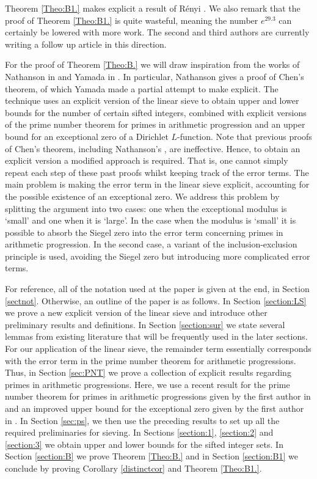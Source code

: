 \documentclass[12pt]{amsart}
\begin{document}
Theorem \ref{Theo:B1.} makes explicit a result of R\'enyi \cite{Renyi}. We also remark that the proof of Theorem \ref{Theo:B1.} is quite wasteful, meaning the number $e^{29.3}$ can certainly be lowered with more work. The second and third authors are currently writing a follow up article in this direction.

For the proof of Theorem \ref{Theo:B.} we will draw inspiration from the works of Nathanson in \cite{Nathanson} and Yamada in \cite{Yamada1}. In particular, Nathanson \cite[Theorem 10.1]{Nathanson} gives a proof of Chen's theorem, of which Yamada \cite[Theorem 1.1]{Yamada1} made a partial attempt to make explicit. The technique uses an explicit version of the linear sieve to obtain upper and lower bounds for the number of certain sifted integers, combined with explicit versions of the prime number theorem for primes in arithmetic progression and an upper bound for an exceptional zero of a Dirichlet $L$-function. Note that previous proofs of Chen's theorem, including Nathanson's \cite{Nathanson}, are ineffective. Hence, to obtain an explicit version a modified approach is required. That is, one cannot simply repeat each step of these past proofs whilst keeping track of the error terms. The main problem is making the error term in the linear sieve explicit, accounting for the possible existence of an exceptional zero. We address this problem by splitting the argument into two cases: one when the exceptional modulus is ‘small' and one when it is  ‘large'. In the case when the modulus is ‘small' it is possible to absorb the Siegel zero into the error term concerning primes in arithmetic progression. In the second case, a variant of the inclusion-exclusion principle is used, avoiding the Siegel zero but introducing more complicated error terms.

For reference, all of the notation used at the paper is given at the end, in Section \ref{sectnot}. Otherwise, an outline of the paper is as follows. In Section \ref{section:LS} we prove a new explicit version of the linear sieve and introduce other preliminary results and definitions. In Section \ref{section:sur} we state several lemmas from existing literature that will be frequently used in the later sections. For our application of the linear sieve, the remainder term essentially corresponds with the error term in the prime number theorem for arithmetic progressions. Thus, in Section \ref{sec:PNT} we prove a collection of explicit results regarding primes in arithmetic progressions. Here, we use a recent result for the prime number theorem for primes in arithmetic progressions given by the first author in \cite{Bordignon4} and an improved upper bound for the exceptional zero given by the first author in \cite{Bordignon1, Bordignon2}. In Section \ref{sec:ps}, we then use the preceding results to set up all the required preliminaries for sieving. In Sections \ref{section:1}, \ref{section:2} and \ref{section:3} we obtain upper and lower bounds for the sifted integer sets. In Section \ref{section:B} we prove Theorem \ref{Theo:B.} and in Section \ref{section:B1} we conclude by proving Corollary \ref{distinctcor} and Theorem \ref{Theo:B1.}.
\end{document}
